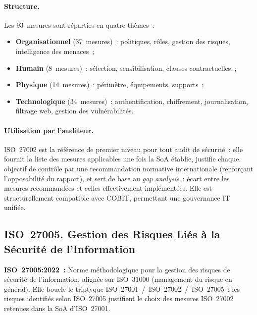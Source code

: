 \paragraph{Structure.} Les 93~mesures sont réparties en quatre thèmes~:
\begin{itemize}
    \item \textbf{Organisationnel} (37~mesures)~: politiques, rôles, gestion des risques,
        intelligence des menaces~;
    \item \textbf{Humain} (8~mesures)~: sélection, sensibilisation, clauses contractuelles~;
    \item \textbf{Physique} (14~mesures)~: périmètre, équipements, supports~;
    \item \textbf{Technologique} (34~mesures)~: authentification, chiffrement, journalisation,
        filtrage web, gestion des vulnérabilités.
\end{itemize}

\paragraph{Utilisation par l'auditeur.} ISO~27002 est la référence de premier niveau pour
tout audit de sécurité~: elle fournit la liste des mesures applicables une fois la SoA
établie, justifie chaque objectif de contrôle par une recommandation normative
internationale (renforçant l'opposabilité du rapport), et sert de base au
\emph{gap analysis}~: écart entre les mesures recommandées et celles effectivement
implémentées. Elle est structurellement compatible avec COBIT, permettant une
gouvernance IT unifiée.

\subsection{ISO~27005. Gestion des Risques Liés à la Sécurité de l'Information}
\label{subsec:iso27005}

\begin{boxdef}
\textbf{ISO~27005:2022~:} Norme méthodologique pour la gestion des risques de sécurité
de l'information, alignée sur ISO~31000 (management du risque en général). Elle boucle
le triptyque ISO~27001~/~ISO~27002~/~ISO~27005~: les risques identifiés selon ISO~27005
justifient le choix des mesures ISO~27002 retenues dans la SoA d'ISO~27001.
\end{boxdef}

